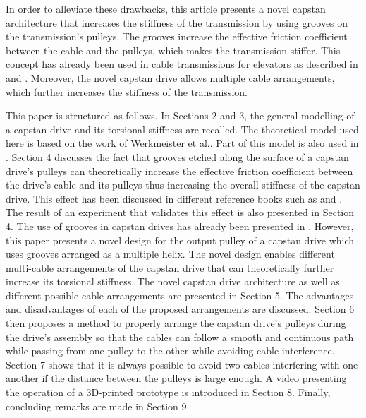 \documentclass[10pt,cleanfoot]{asme2ej}
\begin{document}
In order to alleviate these drawbacks, this article presents a novel capstan architecture that increases the stiffness of the transmission by using grooves on the transmission's pulleys. The grooves increase the effective friction coefficient between the cable and the pulleys, which makes the transmission stiffer. This concept has already been used in cable transmissions for elevators as described in \cite{elevator_german} and \cite{elevator}. Moreover, the novel capstan drive allows multiple cable arrangements, which further increases the stiffness of the transmission.\par This paper is structured as follows. In Sections 2 and 3, the general modelling of a capstan drive and its torsional stiffness are recalled. The theoretical model used here is based on the work of Werkmeister et al.\cite{werkmeister2007theoretical}. Part of this model is also used in \cite{baser2010theoretical}. Section 4 discusses the fact that grooves etched along the surface of a capstan drive's pulleys can theoretically increase the effective friction coefficient between the drive's cable and its pulleys thus increasing the overall stiffness of the capstan drive. This effect has been discussed in different reference books such as \cite{elevator_german} and \cite{elevator}. The result of an experiment that validates this effect is also presented in  Section 4. The use of grooves in capstan drives has already been presented in \cite{lu2012non}. However, this paper presents a novel design for the output pulley of a capstan drive which uses grooves arranged as a multiple helix. The novel design enables different multi-cable arrangements of the capstan drive that can theoretically further increase its torsional stiffness. The novel capstan drive architecture as well as different possible cable arrangements are presented in Section 5. The advantages and disadvantages  of each of the proposed arrangements are discussed. Section 6 then proposes a method to properly arrange the capstan drive's pulleys during the drive's assembly so that the cables can follow a smooth and continuous path while passing from one pulley to the other while avoiding cable interference. Section 7 shows that it is always possible to avoid two cables interfering with one another if the distance between the pulleys is large enough. A video presenting the operation of a 3D-printed prototype is introduced in Section 8. Finally, concluding remarks are made in Section 9.
\end{document}

